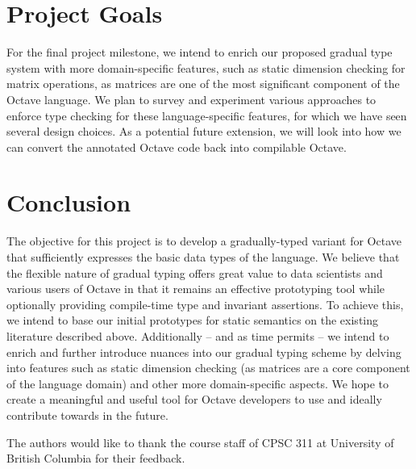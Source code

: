\section{Project Goals}
For the final project milestone, we intend to enrich our proposed gradual type system with more domain-specific features, such as static dimension checking for matrix operations, as matrices are one of the most significant component of the Octave language. We plan to survey and experiment various approaches to enforce type checking for these language-specific features, for which we have seen several design choices. As a potential future extension, we will look into how we can convert the annotated Octave code back into compilable Octave. 

\section{Conclusion}
The objective for this project is to develop a gradually-typed variant for Octave that sufficiently expresses the basic data types of the language. We believe that the flexible nature of gradual typing offers great value to data scientists and various users of Octave in that it remains an effective prototyping tool while optionally providing compile-time type and invariant assertions. To achieve this, we intend to base our initial prototypes for static semantics on the existing literature described above. Additionally – and as time permits – we intend to enrich and further introduce nuances into our gradual typing scheme by delving into features such as static dimension checking (as matrices are a core component of the language domain) and other more domain-specific aspects. We hope to create a meaningful and useful tool for Octave developers to use and ideally contribute towards in the future.


\appendix

\begin{acks}
    The authors would like to thank the course staff of CPSC 311 at University
    of British Columbia for their feedback.
\end{acks}
